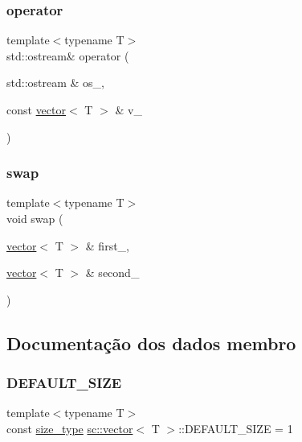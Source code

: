 \subsubsection{\texorpdfstring{operator}{operator}}
{\footnotesize\ttfamily template$<$typename T$>$ \\
std\+::ostream\& operator (\begin{DoxyParamCaption}\item[{std\+::ostream \&}]{os\+\_\+,  }\item[{const \hyperlink{classsc_1_1vector}{vector}$<$ T $>$ \&}]{v\+\_\+ }\end{DoxyParamCaption})\hspace{0.3cm}{\ttfamily [friend]}}

\mbox{\label{classsc_1_1vector_a9198beeb05f24ba2eadccab0a606063c}} 
\subsubsection{\texorpdfstring{swap}{swap}}
{\footnotesize\ttfamily template$<$typename T$>$ \\
void swap (\begin{DoxyParamCaption}\item[{\hyperlink{classsc_1_1vector}{vector}$<$ T $>$ \&}]{first\+\_\+,  }\item[{\hyperlink{classsc_1_1vector}{vector}$<$ T $>$ \&}]{second\+\_\+ }\end{DoxyParamCaption})\hspace{0.3cm}{\ttfamily [friend]}}



\subsection{Documentação dos dados membro}
\mbox{\label{classsc_1_1vector_a287b97d30cd9f7540da7d5ef628e49a7}} 
\subsubsection{\texorpdfstring{D\+E\+F\+A\+U\+L\+T\+\_\+\+S\+I\+ZE}{DEFAULT\_SIZE}}
{\footnotesize\ttfamily template$<$typename T$>$ \\
const \hyperlink{classsc_1_1vector_a48bf37ba1a6d0c13504414d86e27c399}{size\+\_\+type} \hyperlink{classsc_1_1vector}{sc\+::vector}$<$ T $>$\+::D\+E\+F\+A\+U\+L\+T\+\_\+\+S\+I\+ZE = 1\hspace{0.3cm}{\ttfamily [static]}}



